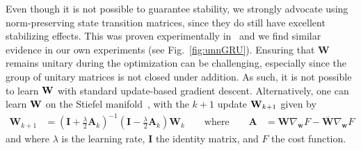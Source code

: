 \documentclass{article}
\begin{document}
Even though it is not possible to guarantee stability, we strongly advocate using norm-preserving state transition matrices, since they do still have excellent stabilizing effects.  This was proven experimentally in~\cite{Arjovsky,Hyland,Wisdom} and we find similar evidence in our own experiments (see Fig.~\ref{fig:unnGRU}).  Ensuring that $\bm{W}$ remains unitary during the optimization can be challenging, especially since the group of unitary matrices is not closed under addition.  As such, it is not possible to learn $\mathbf{W}$ with standard  update-based gradient descent.  Alternatively, one can learn $\mathbf{W}$ on the Stiefel manifold~\cite{Wisdom}, with the $k+1$ update $\mathbf{W}_{k+1}$ given by~\cite{Tagare}
\begin{align}
\mathbf{W}_{k+1} &=  (\mathbf{I} + \frac{\lambda}{2}\mathbf{A}_k)^{-1}(\mathbf{I} - \frac{\lambda}{2}\mathbf{A}_k)\mathbf{W}_k \qquad \text{where} %
\qquad \mathbf{A} &= \mathbf{W}\nabla_{\overline{\bm{w}}}{F} - \overline{\mathbf{W}}\nabla_{{\bm{w}}}{F}
\label{eq:Stiefel}
\end{align}
and where $\lambda$ is the learning rate, $\bm{I}$ the identity matrix, and $F$ the cost function.%


\end{document}
